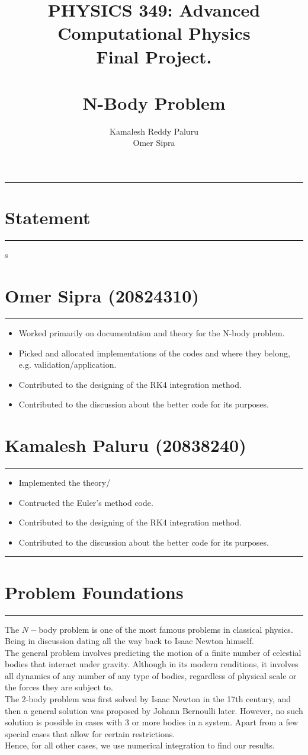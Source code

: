 \documentclass[hidelinks, 11pt, dvipsnames]{article}
\title{PHYSICS 349: Advanced Computational Physics\\
Final Project.\\
\textbf{  } \\
\textbf{N-Body Problem}}
\author{Kamalesh Reddy Paluru\\
Omer Sipra}
\newcommand{\psection}[1]{{
    \begin{center}
        \noindent \rule{17cm}{0.4pt}
        \section*{\LARGE #1}
        \noindent \rule{17cm}{0.4pt}
    \end{center}
}}
\newcommand{\psubsubsection}[1]{{
    \section*{#1}
    \noindent \rule{17cm}{0.11pt}
}}
\begin{document}
    \maketitle
    \psection{Statement}s
    \psubsubsection{Omer Sipra (20824310)}
    \begin{itemize}
        \item Worked primarily on documentation and theory for the N-body problem.
        \item Picked and allocated implementations of the codes and where they belong, e.g. validation/application.
        \item Contributed to the designing of the RK4 integration method.
        \item Contributed to the discussion about the better code for its purposes.
    \end{itemize}

    \psubsubsection{Kamalesh Paluru (20838240)}
    \begin{itemize}
        \item Implemented the theory/
        \item Contructed the Euler's method code.
        \item Contributed to the designing of the RK4 integration method.
        \item Contributed to the discussion about the better code for its purposes.
    \end{itemize}

    \newpage
    \psection{Problem Foundations}
    The $N-$body problem is one of the most famous problems in classical physics. Being in discussion dating all the way back to Isaac Newton himself. \\

    The general problem involves predicting the motion of a finite number of celestial bodies that interact under gravity. Although in its modern renditions, it involves all dynamics of any number of any type of bodies, regardless of physical scale or the forces they are subject to.\\

    The 2-body problem was first solved by Isaac Newton in the 17th century, and then a general solution was proposed by Johann Bernoulli later. However, no such solution is possible in cases with 3 or more bodies in a system. Apart from a few special cases that allow for certain restrictions. \\

    Hence, for all other cases, we use numerical integration to find our results.\\
\end{document}
